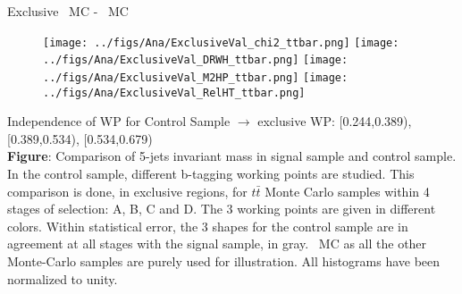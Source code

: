\begin{frame}{Exclusive \ttbar~MC - \ttbar~MC}
\vspace{-.2cm}
\begin{figure}[!Hhtbp]
  \begin{center}
    \texttt{[image: ../figs/Ana/ExclusiveVal\_chi2\_ttbar.png]}
    \texttt{[image: ../figs/Ana/ExclusiveVal\_DRWH\_ttbar.png]}
    \texttt{[image: ../figs/Ana/ExclusiveVal\_M2HP\_ttbar.png]}
    \texttt{[image: ../figs/Ana/ExclusiveVal\_RelHT\_ttbar.png]}
  \end{center}
\end{figure}

\vspace{-.2cm}
    \begin{block}{}\tiny
      Independence of WP for Control Sample $\to$ exclusive WP: [0.244,0.389), [0.389,0.534), [0.534,0.679)\\
      \textbf{Figure}: Comparison of 5-jets invariant mass in signal sample and control sample. In the control sample, different b-tagging working points are studied. This comparison is done, in exclusive regions, for $t\bar{t}$ Monte Carlo samples within 4 stages of selection: A, B, C and D. The 3 working points are given in different colors. Within statistical error, the 3 shapes for the control sample are in agreement at all stages with the signal sample, in gray. \ttbar~MC as all the other Monte-Carlo samples are purely used for illustration. All histograms have been normalized to unity.
    \end{block}

\end{frame}

